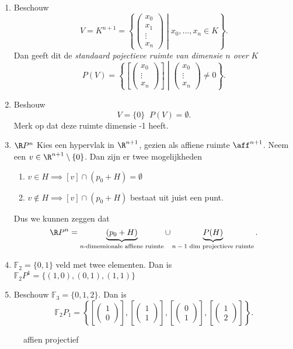 \begin{vb}
	\begin{enumerate}
		\item Beschouw \[
		V = K^{n +1} = \left\{ \begin{pmatrix} x_0 \\ x_1 \\ \vdots \\ x_n \end{pmatrix} \middle | x_0, \ldots, x_n \in K \right\} 
		.\] 
		Dan geeft dit de \emph{standaard pojectieve ruimte van dimensie $n$ over $K$ }
		\[
			P(V) = \left\{ \left[ \begin{pmatrix} x_0 \\ \vdots \\ x_n \end{pmatrix}  \right] \middle | \begin{pmatrix} x_0 \\ \vdots \\ x_n \end{pmatrix} \ne 0  \right\} 
		.\] 
	\item Beshouw \[
			V = \{0\} \;\; P(V) = \emptyset
	.\] 
	Merk op dat deze ruimte dimensie -1 heeft. 
\item $\R P^{n}$ 
	Kies een hypervlak in $\R^{n+1}$, gezien als affiene ruimte $\aff^{n+1}$.
	Neem een $v \in \R^{n+1} \setminus \{ 0\} $. Dan zijn er twee mogelijkheden
	\begin{enumerate}
		\item $v \in H \implies [v] \cap (p_0 + H) = \emptyset$
		\item $v \not\in H \implies [v] \cap (p_0 + H)$ bestaat uit juist een punt.
	\end{enumerate}
	Dus we kunnen zeggen dat \[
		\R P ^{n } = \underbrace{(p_0 + H)}_\text{$n$-dimesnionale affiene ruimte} \cup \underbrace{P(H)}_\text{$n-1$ dim projectieve ruimte}
	.\] 

\item 
	$\mathbb F_2 = \{0,1\} $ veld met twee elementen. Dan is $\mathbb F_2 P^{1} = \{(1,0),(0,1),(1,1)\} $
\item Beschouw $\mathbb F_3 = \{0,1,2\} $. Dan is \[
\mathbb F_2P_1 = \left\{ \left[ \begin{pmatrix} 1 \\ 0 \end{pmatrix}  \right] , \left[ \begin{pmatrix} 1 \\ 1 \end{pmatrix}  \right], \left[ \begin{pmatrix} 0\\ 1 \end{pmatrix}  \right]  , \left[ \begin{pmatrix} 1 \\ 2 \end{pmatrix}  \right]  \right\} 
.\] 
	\end{enumerate}
\end{vb}
\begin{figure}[ht]
    \centering
    \caption{affien projectief}
    \label{fig:affien-projectief}
\end{figure}

